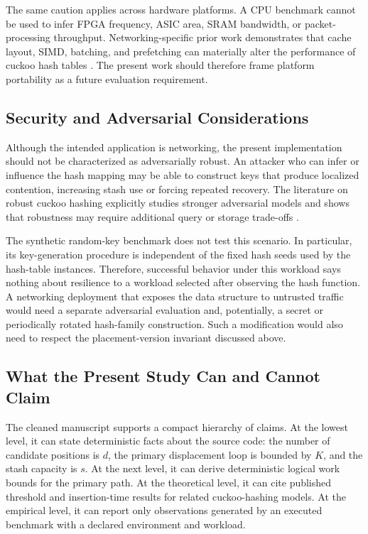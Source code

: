 \documentclass[conference]{IEEEtran}
\begin{document}
The same caution applies across hardware platforms. A CPU benchmark cannot be
used to infer FPGA frequency, ASIC area, SRAM bandwidth, or packet-processing
throughput. Networking-specific prior work demonstrates that cache layout,
SIMD, batching, and prefetching can materially alter the performance of cuckoo
hash tables \cite{lescouarnec2018cuckoopp}. The present work should therefore
frame platform portability as a future evaluation requirement.

\subsection{Security and Adversarial Considerations}
\label{subsec:discussion_security}

Although the intended application is networking, the present implementation
should not be characterized as adversarially robust. An attacker who can infer
or influence the hash mapping may be able to construct keys that produce
localized contention, increasing stash use or forcing repeated recovery. The
literature on robust cuckoo hashing explicitly studies stronger adversarial
models and shows that robustness may require additional query or storage
trade-offs \cite{yeo2023cuckoo}.

The synthetic random-key benchmark does not test this scenario. In particular,
its key-generation procedure is independent of the fixed hash seeds used by the
hash-table instances. Therefore, successful behavior under this workload says
nothing about resilience to a workload selected after observing the hash
function. A networking deployment that exposes the data structure to
untrusted traffic would need a separate adversarial evaluation and, potentially,
a secret or periodically rotated hash-family construction. Such a modification
would also need to respect the placement-version invariant discussed above.

\subsection{What the Present Study Can and Cannot Claim}
\label{subsec:discussion_claims}

The cleaned manuscript supports a compact hierarchy of claims. At the lowest
level, it can state deterministic facts about the source code: the number of
candidate positions is $d$, the primary displacement loop is bounded by $K$,
and the stash capacity is $s$. At the next level, it can derive deterministic
logical work bounds for the primary path. At the theoretical level, it can cite
published threshold and insertion-time results for related cuckoo-hashing
models. At the empirical level, it can report only observations generated by
an executed benchmark with a declared environment and workload.
\end{document}
